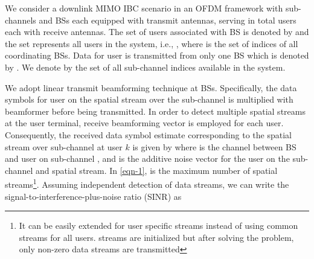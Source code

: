 We consider a downlink \ac{MIMO} \ac{IBC} scenario in an \ac{OFDM} framework with  sub-channels and  \acp{BS} each equipped with  transmit antennas, serving in total  users each with  receive antennas. The set of users associated with \ac{BS}  is denoted by  and the set  represents all users in the system, i.e., , where  is the set of indices of all coordinating \acp{BS}. Data for user  is transmitted from only one \ac{BS} which is denoted by . We denote by  the set of all sub-channel indices available in the system. 

We adopt linear transmit beamforming technique at \acp{BS}. Specifically, the data symbols  for  user  on the  spatial stream over the sub-channel  is multiplied with beamformer  before being transmitted. In order to detect  multiple spatial streams at the user terminal, receive beamforming vector  is employed for each user. Consequently, the received data symbol estimate corresponding to the  spatial stream over sub-channel  at user $k$ is given by
\iftoggle{single_column}{
\begin{equation}\label{eqn-1}
\hat{d}_{l,k,n} = \mvec{w}{l,k,n}^\herm \mvec{H}{b_k,k,n} \,\mvec{m}{l,k,n} d_{l,k,n} + \mvec{w}{l,k,n}^\herm \sum_{i \in \mc{U} \backslash \set{k}} \mvec{H}{b_i,k,n} \sum_{j = 1}^L \mvec{m}{j,i,n}d_{j,i,n} + \mvec{w}{l,k,n}^\herm \mvec{n}{k,n},
\end{equation}
}{
\begin{multline}\label{eqn-1}
\hat{d}_{l,k,n} = \mvec{w}{l,k,n}^\herm \mvec{H}{b_k,k,n} \,\mvec{m}{l,k,n} d_{l,k,n} + \mvec{w}{l,k,n}^\herm \mvec{n}{k,n} \\ 
+ \mvec{w}{l,k,n}^\herm \sum_{i \in \mc{U} \backslash \set{k}} \mvec{H}{b_i,k,n} \sum_{j = 1}^L \mvec{m}{j,i,n}d_{j,i,n},
\end{multline}
}
where  is the channel between \ac{BS}  and  user  on sub-channel , and   is the additive noise vector for the user  on the  sub-channel and  spatial stream. In \eqref{eqn-1},  is the maximum number of spatial streams\footnote{It can be easily extended for user specific streams  instead of using common  streams for all users.  streams are initialized but after solving the problem, only  non-zero data streams are transmitted}. Assuming independent detection of data streams, we can write the signal-to-interference-plus-noise ratio (SINR) as
